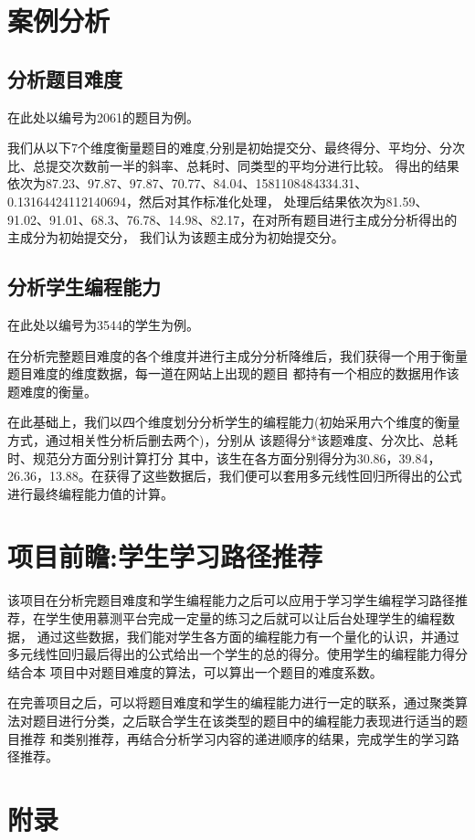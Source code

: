 \documentclass[UTF8]{ctexart}
\begin{document}
\section{案例分析}
\subsection{分析题目难度}
在此处以编号为2061的题目为例。

我们从以下7个维度衡量题目的难度,分别是初始提交分、最终得分、平均分、分次比、总提交次数前一半的斜率、总耗时、同类型的平均分进行比较。
得出的结果依次为87.23、97.87、97.87、70.77、84.04、1581108484334.31、0.13164424112140694，然后对其作标准化处理，
处理后结果依次为81.59、91.02、91.01、68.3、76.78、14.98、82.17，在对所有题目进行主成分分析得出的主成分为初始提交分，
我们认为该题主成分为初始提交分。
\subsection{分析学生编程能力}
在此处以编号为3544的学生为例。

在分析完整题目难度的各个维度并进行主成分分析降维后，我们获得一个用于衡量题目难度的维度数据，每一道在网站上出现的题目
都持有一个相应的数据用作该题难度的衡量。

在此基础上，我们以四个维度划分分析学生的编程能力(初始采用六个维度的衡量方式，通过相关性分析后删去两个)，分别从 该题得分*该题难度、分次比、总耗时、规范分方面分别计算打分
其中，该生在各方面分别得分为30.86，39.84，26.36，13.88。在获得了这些数据后，我们便可以套用多元线性回归所得出的公式进行最终编程能力值的计算。
\section{项目前瞻:学生学习路径推荐}
该项目在分析完题目难度和学生编程能力之后可以应用于学习学生编程学习路径推荐，在学生使用慕测平台完成一定量的练习之后就可以让后台处理学生的编程数据，
通过这些数据，我们能对学生各方面的编程能力有一个量化的认识，并通过多元线性回归最后得出的公式给出一个学生的总的得分。使用学生的编程能力得分结合本
项目中对题目难度的算法，可以算出一个题目的难度系数。

在完善项目之后，可以将题目难度和学生的编程能力进行一定的联系，通过聚类算法对题目进行分类，之后联合学生在该类型的题目中的编程能力表现进行适当的题目推荐
和类别推荐，再结合分析学习内容的递进顺序的结果，完成学生的学习路径推荐。

\section{附录}
\end{document}
